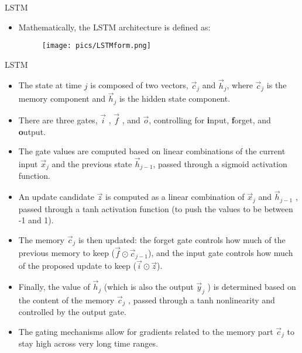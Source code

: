 \documentclass[handout]{beamer}
\begin{document}
\begin{frame}{LSTM}
\begin{scriptsize}

\begin{itemize}
\item Mathematically, the LSTM architecture is defined as:
  \begin{figure}[h]
        	\texttt{[image: pics/LSTMform.png]}
        \end{figure}
\end{itemize}
\end{scriptsize}
\end{frame}


\begin{frame}{LSTM}
\begin{scriptsize}

\begin{itemize}
\item The state at time $j$ is composed of two vectors, $\vec{c}_j$ and $\vec{h}_{j}$, where $\vec{c}_j$ is the memory component and $\vec{h}_j$ is the hidden state component.
\item There are three gates, $\vec{i}$ , $\vec{f}$ , and $\vec{o}$, controlling for \textbf{i}nput, \textbf{f}orget, and \textbf{o}utput.
\item The gate values are computed based on linear combinations of the current input $\vec{x}_j$ and the previous state $\vec{h}_{j-1}$, passed through a sigmoid activation function.
\item An update candidate $\vec{z}$ is computed as a linear combination of $\vec{x}_j$ and $\vec{h}_{j-1}$ , passed through a tanh activation function (to push the values to be between -1 and 1).
\item The memory $\vec{c}_j$ is then updated: the forget gate controls how much of the previous memory to keep ($\vec{f} \odot \vec{c}_{j-1}$), and the input gate controls how much of the proposed update to keep ($\vec{i} \odot  \vec{z}$). 
\item Finally, the value of $\vec{h}_j$ (which is also the output $\vec{y}_j$ ) is determined based on the content of the memory $\vec{c}_j$ , passed through a tanh nonlinearity and controlled by the output gate. 
\item The gating mechanisms allow for gradients related to the memory part $\vec{c}_j$ to stay high across very long time ranges.
\end{itemize}
\end{scriptsize}
\end{frame}
\end{document}
